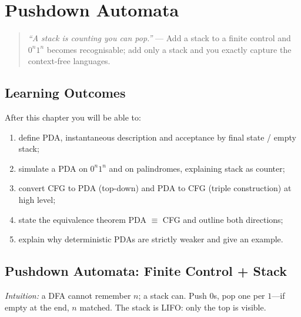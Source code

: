 \chapter{Pushdown Automata}
\label{ch:pushdown}

\begin{quote}
\emph{``A stack is counting you can pop.''} --- Add a stack to a finite control and $0^n1^n$ becomes recognisable; add only a stack and you exactly capture the context-free languages.
\end{quote}

\noindent{}
\vspace{0.4em}

\section*{Learning Outcomes}
After this chapter you will be able to:
\begin{enumerate}[label=(L\arabic*)]
    \item define PDA, instantaneous description and acceptance by final state / empty stack;
    \item simulate a PDA on $0^n1^n$ and on palindromes, explaining stack as counter;
    \item convert CFG to PDA (top-down) and PDA to CFG (triple construction) at high level;
    \item state the equivalence theorem PDA $\equiv$ CFG and outline both directions;
    \item explain why deterministic PDAs are strictly weaker and give an example.
\end{enumerate}

\section{Pushdown Automata: Finite Control + Stack}
\label{sec:pda-def}
\emph{Intuition:} a DFA cannot remember $n$; a stack can. Push $0$s, pop one per $1$---if empty at the end, $n$ matched. The stack is LIFO: only the top is visible.

